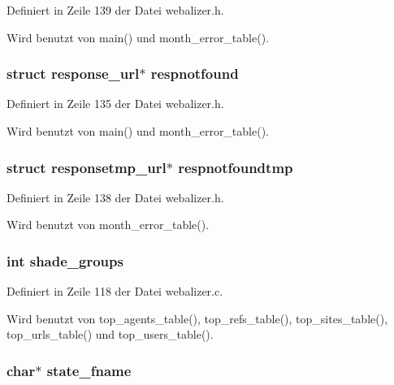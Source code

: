 Definiert in Zeile 139 der Datei webalizer.h.

Wird benutzt von main() und month\_\-error\_\-table().
\subsubsection{\setlength{\rightskip}{0pt plus 5cm}struct {\bf response\_\-url}$\ast$ {\bf respnotfound}}\label{webalizer_8h_a8ed05f974eff62796d7d6bb0863d253}




Definiert in Zeile 135 der Datei webalizer.h.

Wird benutzt von main() und month\_\-error\_\-table().
\subsubsection{\setlength{\rightskip}{0pt plus 5cm}struct {\bf responsetmp\_\-url}$\ast$ {\bf respnotfoundtmp}}\label{webalizer_8h_c86ff2f54b16d3d0c0b7c732acd5d2dc}




Definiert in Zeile 138 der Datei webalizer.h.

Wird benutzt von month\_\-error\_\-table().
\subsubsection{\setlength{\rightskip}{0pt plus 5cm}int {\bf shade\_\-groups}}\label{webalizer_8h_9b469898b01940a383f1ed816e4459b2}




Definiert in Zeile 118 der Datei webalizer.c.

Wird benutzt von top\_\-agents\_\-table(), top\_\-refs\_\-table(), top\_\-sites\_\-table(), top\_\-urls\_\-table() und top\_\-users\_\-table().
\subsubsection{\setlength{\rightskip}{0pt plus 5cm}char$\ast$ {\bf state\_\-fname}}\label{webalizer_8h_bc6083147b471a6df297cc5851057771}




